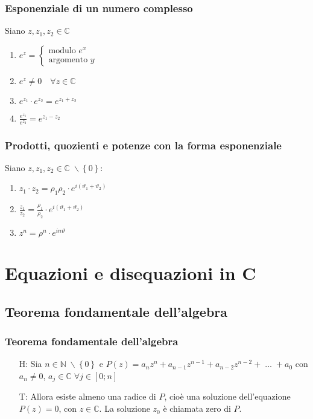 \documentclass[a4paper]{article}
\begin{document}
\subsubsection*{Esponenziale di un numero complesso}
Siano \(z, z_1, z_2 \in \mathbb{C}\)
\begin{enumerate}
	\item \(e^z =
	\begin{cases}
		\text{modulo } e^x \\
		\text{argomento } y
	\end{cases}\)
	\item \(e ^ z \neq 0 \quad \forall z \in \mathbb{C}\)
	\item \(e ^ {z_1} \cdot e ^ {z_2} = e ^ {z_1 + z_2}\)
	\item \(\displaystyle \frac{e ^ {z_1}}{e ^ {z_2}} = e ^ {z_1 - z_2}\)
\end{enumerate}

\subsubsection*{Prodotti, quozienti e potenze con la forma esponenziale}
Siano \(z, z_1, z_2 \in \mathbb{C} \; \backslash \left\{ 0 \right\}\):
\begin{enumerate}
	\item \(z_1 \cdot z_2 = \rho_1 \rho_2 \cdot e ^ {i \left( \vartheta_1 + \vartheta_2 \right)}\)
	\item \(\displaystyle \frac{z_1}{z_2} = \frac{\rho_1}{\rho_2} \cdot e ^ {i \left( \vartheta_1 + \vartheta_2 \right)}\)
	\item \(z ^ n = \rho ^ n \cdot e ^ {i n \vartheta}\)
\end{enumerate}

\newpage


\section{Equazioni e disequazioni in C}
\subsection{Teorema fondamentale dell'algebra}
\subsubsection*{Teorema fondamentale dell'algebra}
\begin{itemize}
	\item[H:] Sia \(n \in \mathbb{N} \; \backslash \left\{ 0 \right\}\) e \(P(z) = a_n z^n + a_{n-1} z^{n-1} + a_{n-2} z^{n-2} + \; \dots \; + a_0\)
	con \(a_n \neq 0\), \(a_j \in \mathbb{C} \; \forall j \in \left[0; n\right]\) 
	\item[T:] Allora esiste almeno una radice di \(P\), cioè una soluzione dell'equazione \(P(z) = 0\), con \(z \in \mathbb{C}\).
	La soluzione \(z_0\) è chiamata zero di \(P\).
\end{itemize}
\end{document}
